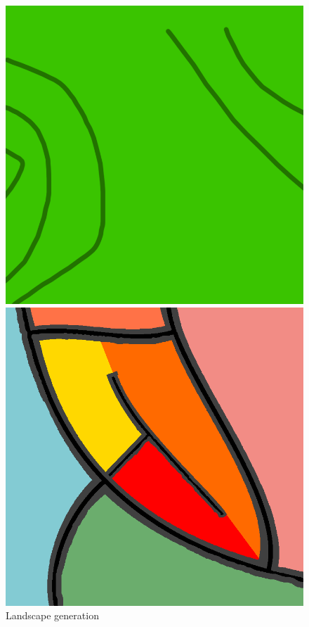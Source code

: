 \begin{figure}[H]
    \includegraphics[width=\linewidth]{figure/method_generation_1.png}
    \caption{Landscape generation}\label{fig:awesome_image1}
  \endminipage\hfill
    \includegraphics[width=\linewidth]{figure/method_generation_2.png}

\end{figure}
